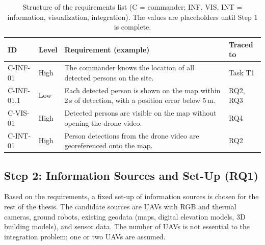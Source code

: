 \documentclass{article}
\begin{document}
\begin{table}[h]
\centering
\small
\renewcommand{\arraystretch}{1.3}
\begin{tabularx}{\textwidth}{@{}l>{\raggedright\arraybackslash}p{2.2cm}>{\raggedright\arraybackslash}X>{\raggedright\arraybackslash}p{2.2cm}@{}}
\toprule
\textbf{ID} & \textbf{Level} & \textbf{Requirement (example)} & \textbf{Traced to} \\
\midrule
C-INF-01 & High & The commander knows the location of all detected persons on the site. & Task T1 \\
C-INF-01.1 & Low & Each detected person is shown on the map within 2\,s of detection, with a position error below 5\,m. & RQ2, RQ3 \\
C-VIS-01 & High & Detected persons are visible on the map without opening the drone video. & RQ4 \\
C-INT-01 & High & Person detections from the drone video are georeferenced onto the map. & RQ2 \\
\bottomrule
\end{tabularx}
\caption{Structure of the requirements list (C = commander; INF, VIS, INT = information, visualization, integration). The values are placeholders until Step 1 is complete.}
\label{tab:req-template}
\end{table}


\subsection{Step 2: Information Sources and Set-Up (RQ1)}
Based on the requirements, a fixed set-up of information sources is chosen for the rest of the thesis.
The candidate sources are UAVs with RGB and thermal cameras, ground robots, existing geodata (maps, digital elevation models, 3D building models), and sensor data.
The number of UAVs is not essential to the integration problem; one or two UAVs are assumed.

\end{document}
